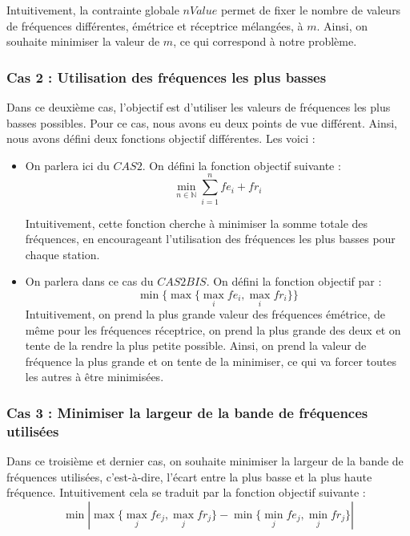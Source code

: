 \documentclass[a4paper, 10pt]{article}
\begin{document}
        Intuitivement, la contrainte globale $nValue$ permet de fixer le nombre de valeurs de fréquences différentes, émétrice et réceptrice mélangées, à $m$. Ainsi, on souhaite minimiser la valeur de $m$, ce qui correspond à notre problème.

      \subsubsection{Cas 2 : Utilisation des fréquences les plus basses}

        Dans ce deuxième cas, l'objectif est d'utiliser les valeurs de fréquences les plus basses possibles. Pour ce cas, nous avons eu deux points de vue différent. Ainsi, nous avons défini deux fonctions objectif différentes. Les voici :
        \begin{itemize}
          \item On parlera ici du $CAS 2$. On défini la fonction objectif suivante :
                $$ \displaystyle{\min_{n \in \mathbb{N}} \sum_{i=1}^{n} fe_i + fr_i } $$

                Intuitivement, cette fonction cherche à minimiser la somme totale des fréquences, en encourageant l'utilisation des fréquences les plus basses pour chaque station.

           \item On parlera dans ce cas du $CAS 2BIS$. On défini la fonction objectif par :
                 $$ \displaystyle{\min \{ \max \{ \max_{i} fe_i , \max_{i} fr_i \} \}} $$
                 Intuitivement, on prend la plus grande valeur des fréquences émétrice, de même pour les fréquences réceptrice, on prend la plus grande des deux et on tente de la rendre la plus petite possible. Ainsi, on prend la valeur de fréquence la plus grande et on tente de la minimiser, ce qui va forcer toutes les autres à être minimisées.
        \end{itemize}

      \subsubsection{Cas 3 : Minimiser la largeur de la bande de fréquences utilisées}

        Dans ce troisième et dernier cas, on souhaite minimiser la largeur de la bande de fréquences utilisées, c'est-à-dire, l'écart entre la plus basse et la plus haute fréquence. Intuitivement cela se traduit par la fonction objectif suivante :
        $$ \displaystyle{ \min_{} | \max_{} \{\max_{j} fe_j, \max_{j} fr_j\}  - \min_{} \{\min_{j} fe_j, \min_{j} fr_j\}  |} $$
\end{document}
